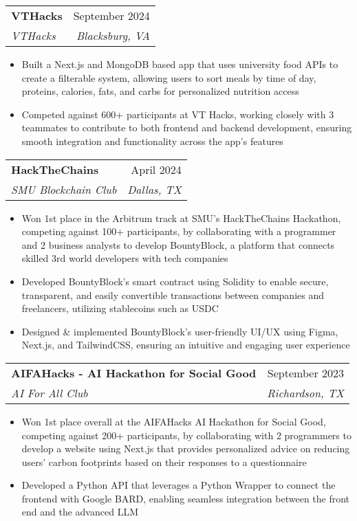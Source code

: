 \documentclass[letterpaper,11pt]{article}
\makeatletter
\newcommand{\resumeItem}[1]{
  \item\small{
    {#1 \vspace{-2pt}}
  }
}
\newcommand{\resumeSubheading}[4]{
      \vspace{-2pt}\item
        \begin{tabular*}{0.97\textwidth}[t]{l@{\extracolsep{\fill}}r}
          \textbf{#1} & #2 \\
          \textit{\small#3} & \textit{\small #4} \\
        \end{tabular*}\vspace{-7pt}
}
\newcommand{\resumeSubSubheading}[2]{
    \item
    \begin{tabular*}{0.97\textwidth}{l@{\extracolsep{\fill}}r}
      \textit{\small#1} & \textit{\small #2} \\
    \end{tabular*}\vspace{-7pt}
}
\newcommand{\resumeSubHeadingListEnd}{\end{itemize}}
\newcommand{\resumeItemListStart}{\begin{itemize}}
\newcommand{\resumeItemListEnd}{\end{itemize}\vspace{-5pt}}
\makeatother
\begin{document}
      \resumeSubheading
      {VTHacks}{September 2024}
      {VTHacks}{Blacksburg, VA}
      \resumeItemListStart
        \resumeItem{Built a Next.js and MongoDB based app that uses university food APIs to create a filterable system, allowing users to sort meals by time of day, proteins, calories, fats, and carbs for personalized nutrition access}
        \resumeItem{Competed against 600+ participants at VT Hacks, working closely with 3 teammates to contribute to both frontend and backend development, ensuring smooth integration and functionality across the app’s features}
      \resumeItemListEnd
      

    \resumeSubheading
      {HackTheChains}{April 2024}
      {SMU Blockchain Club}{Dallas, TX}
      \resumeItemListStart
        \resumeItem{Won 1st place in the Arbitrum track at SMU's HackTheChains Hackathon, competing against 100+ participants, by collaborating with a programmer and 2 business analysts to develop BountyBlock, a platform that connects skilled 3rd world developers with tech companies}
        \resumeItem{Developed BountyBlock's smart contract using Solidity to enable secure, transparent, and easily convertible transactions between companies and freelancers, utilizing stablecoins such as USDC}
        \resumeItem{Designed \& implemented BountyBlock's user-friendly UI/UX using Figma, Next.js, and TailwindCSS, ensuring an intuitive and engaging user experience}
    \resumeItemListEnd

    \resumeSubheading
      {AIFAHacks - AI Hackathon for Social Good}{September 2023}
      {AI For All Club}{Richardson, TX}
      \resumeItemListStart
        \resumeItem{Won 1st place overall at the AIFAHacks AI Hackathon for Social Good, competing against 200+ participants, by collaborating with 2 programmers to develop a website using Next.js that provides personalized advice on reducing users' carbon footprints based on their responses to a questionnaire}
        \resumeItem{Developed a Python API that leverages a Python Wrapper to connect the frontend with Google BARD, enabling seamless integration between the front end and the advanced LLM}
      \resumeItemListEnd
\end{document}
